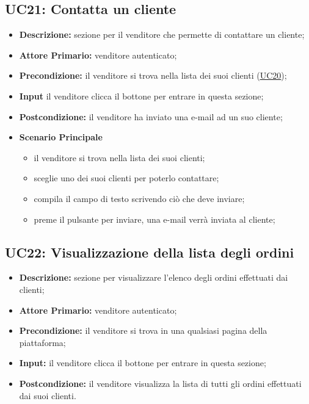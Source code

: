         \subsection{UC21: Contatta un cliente}
        \label{sec:UC21}
        \begin{itemize}
            \item \textbf{Descrizione:} sezione per il venditore che permette di contattare un cliente;
            \item \textbf{Attore Primario:} venditore autenticato;
            \item \textbf{Precondizione:} il venditore si trova nella lista dei suoi clienti (\hyperref[sec:UC20]{\underline{UC20}});
            \item \textbf{Input} il venditore clicca il bottone per entrare in questa sezione; 
            \item \textbf{Postcondizione:} il venditore ha inviato una e-mail ad un suo cliente;
            \item \textbf{Scenario Principale}
                \begin{itemize}
                    \item il venditore si trova nella lista dei suoi clienti;
                    \item sceglie uno dei suoi clienti per poterlo contattare;
                    \item compila il campo di testo scrivendo ciò che deve inviare;
                    \item preme il pulsante per inviare, una e-mail verrà inviata al cliente;
                \end{itemize}
        \end{itemize}
        \subsection{UC22: Visualizzazione della lista degli ordini}
        \label{sec:UC22}
        \begin{itemize}
            \item \textbf{Descrizione:} sezione per visualizzare l'elenco degli ordini effettuati dai clienti;
            \item \textbf{Attore Primario:} venditore autenticato; 
            \item \textbf{Precondizione:} il venditore si trova in una qualsiasi pagina della piattaforma;
            \item \textbf{Input:} il venditore clicca il bottone per entrare in questa sezione; 
            \item \textbf{Postcondizione:} il venditore visualizza la lista di tutti gli ordini effettuati dai suoi clienti.
        \end{itemize}
        
